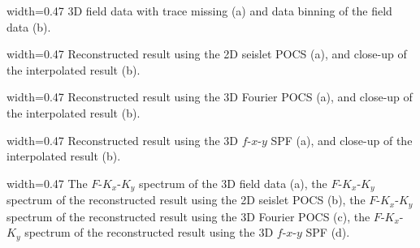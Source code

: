 \begin{table}
    \renewcommand\tabcolsep{3.5pt} 
    \renewcommand{\arraystretch}{1.3} 
    \caption{Comparison of time consumption.}
    \label{tb:time}
    \centering
\end{table}


 {width=0.47\columnwidth} {3D field data
  with trace missing (a) and data binning of the field data (b).}

 {width=0.47\columnwidth}
{Reconstructed result using the 2D seislet POCS (a), and close-up of
  the interpolated result (b).}

 {width=0.47\columnwidth}
{Reconstructed result using the 3D Fourier POCS (a), and close-up of
  the interpolated result (b).}

 {width=0.47\columnwidth} {Reconstructed
  result using the 3D $f$-$x$-$y$ SPF (a), and close-up of the
  interpolated result (b).}

{width=0.47\columnwidth} {The $F$-$K_{x}$-$K_{y}$ spectrum of the 3D
  field data (a), the $F$-$K_{x}$-$K_{y}$ spectrum of the
  reconstructed result using the 2D seislet POCS (b), the
  $F$-$K_{x}$-$K_{y}$ spectrum of the reconstructed result using the
  3D Fourier POCS (c), the $F$-$K_{x}$-$K_{y}$ spectrum of the
  reconstructed result using the 3D $f$-$x$-$y$ SPF (d).}


